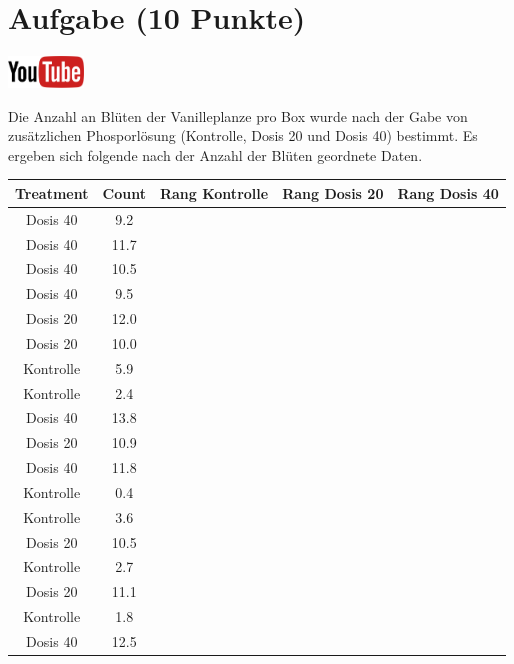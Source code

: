 \documentclass[a4paper, 10pt]{scrartcl}\usepackage[]{graphicx}\usepackage[]{xcolor}
\newenvironment{knitrout}{}{} %
\begin{document}
\section{Aufgabe \hfill (10 Punkte)}

\hfill\href{https://youtu.be/gC0SXiIG2wQ}{\includegraphics[width =
  2cm]{img/youtube}} %
\hspace{2Ex}




Die Anzahl an Bl{\"u}ten der Vanilleplanze pro Box wurde nach der Gabe von
zus{\"a}tzlichen Phosporl{\"o}sung (Kontrolle, Dosis 20 und Dosis 40) bestimmt. Es
ergeben sich folgende nach der Anzahl der Bl{\"u}ten geordnete Daten.

\begin{knitrout}
\color{fgcolor}\begin{table}[!h]
\centering
\begin{tabular}{ccccc}
\toprule
Treatment & Count & Rang Kontrolle & Rang Dosis 20 & Rang Dosis 40\\
\midrule
Dosis 40 & 9.2 &  &  & \\
Dosis 40 & 11.7 &  &  & \\
Dosis 40 & 10.5 &  &  & \\
Dosis 40 & 9.5 &  &  & \\
Dosis 20 & 12.0 &  &  & \\
\addlinespace
Dosis 20 & 10.0 &  &  & \\
Kontrolle & 5.9 &  &  & \\
Kontrolle & 2.4 &  &  & \\
Dosis 40 & 13.8 &  &  & \\
Dosis 20 & 10.9 &  &  & \\
\addlinespace
Dosis 40 & 11.8 &  &  & \\
Kontrolle & 0.4 &  &  & \\
Kontrolle & 3.6 &  &  & \\
Dosis 20 & 10.5 &  &  & \\
Kontrolle & 2.7 &  &  & \\
\addlinespace
Dosis 20 & 11.1 &  &  & \\
Kontrolle & 1.8 &  &  & \\
Dosis 40 & 12.5 &  &  & \\
\bottomrule
\end{tabular}
\end{table}

\end{knitrout}
\end{document}
